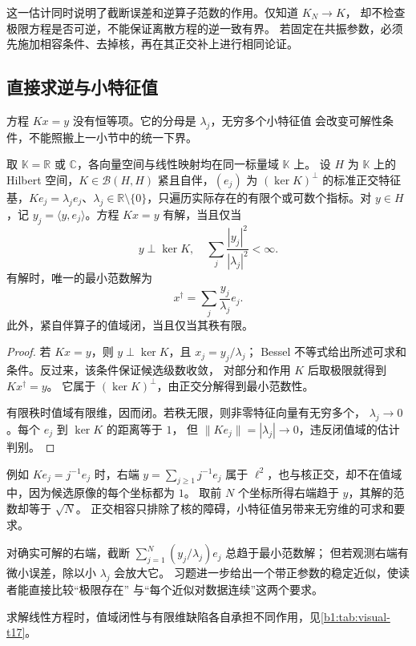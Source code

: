 这一估计同时说明了截断误差和逆算子范数的作用。仅知道 \(K_N\to K\)，
却不检查极限方程是否可逆，不能保证离散方程的逆一致有界。
若固定在共振参数，必须先施加相容条件、去掉核，再在其正交补上进行相同论证。

\subsection{直接求逆与小特征值}
\label{b1:subsec:C10503}

方程 \(Kx=y\) 没有恒等项。它的分母是 \(\lambda_j\)，无穷多个小特征值
会改变可解性条件，不能照搬上一小节中的统一下界。

\begin{proposition}\label{b1:prop:C1-spectral-range}
取 \(\mathbb K=\mathbb R\) 或 \(\mathbb C\)，各向量空间与线性映射均在同一标量域 \(\mathbb K\) 上。
设 \(H\) 为 \(\mathbb K\) 上的 Hilbert 空间，\(K\in\mathcal B(H,H)\) 紧且自伴，\((e_j)\) 为 \((\ker K)^\perp\) 的标准正交特征基，\(Ke_j=\lambda_je_j\)、\(\lambda_j\in\mathbb R\setminus\{0\}\)，只遍历实际存在的有限个或可数个指标。对 \(y\in H\)，记 \(y_j=\langle y,e_j\rangle\)。方程 \(Kx=y\) 有解，当且仅当
\[
 y\perp\ker K,\quad \sum_j\frac{|y_j|^2}{|\lambda_j|^2}<\infty.
\]
有解时，唯一的最小范数解为
\[
 x^\dagger=\sum_j\frac{y_j}{\lambda_j}e_j.
\]
此外，紧自伴算子的值域闭，当且仅当其秩有限。
\end{proposition}
\begin{proof}
若 \(Kx=y\)，则 \(y\perp\ker K\)，且 \(x_j=y_j/\lambda_j\)；
Bessel 不等式给出所述可求和条件。反过来，该条件保证候选级数收敛，
对部分和作用 \(K\) 后取极限就得到 \(Kx^\dagger=y\)。
它属于 \((\ker K)^\perp\)，由正交分解得到最小范数性。

有限秩时值域有限维，因而闭。若秩无限，则非零特征向量有无穷多个，
\(\lambda_j\to0\)。每个 \(e_j\) 到 \(\ker K\) 的距离等于 \(1\)，
但 \(\|Ke_j\|=|\lambda_j|\to0\)，违反闭值域的估计判别。
\end{proof}

例如 \(Ke_j=j^{-1}e_j\) 时，右端 \(y=\sum_{j\geq1}j^{-1}e_j\) 属于
\(\ell^2\)，也与核正交，却不在值域中，因为候选原像的每个坐标都为 \(1\)。
取前 \(N\) 个坐标所得右端趋于 \(y\)，其解的范数却等于 \(\sqrt N\)。
正交相容只排除了核的障碍，小特征值另带来无穷维的可求和要求。

\ProseParagraphBreak

对确实可解的右端，截断
\(\sum_{j=1}^N(y_j/\lambda_j)e_j\) 总趋于最小范数解；
但若观测右端有微小误差，除以小 \(\lambda_j\) 会放大它。
习题进一步给出一个带正参数的稳定近似，使读者能直接比较“极限存在”
与“每个近似对数据连续”这两个要求。

求解线性方程时，值域闭性与有限维缺陷各自承担不同作用，见\cref{b1:tab:visual-t17}。

